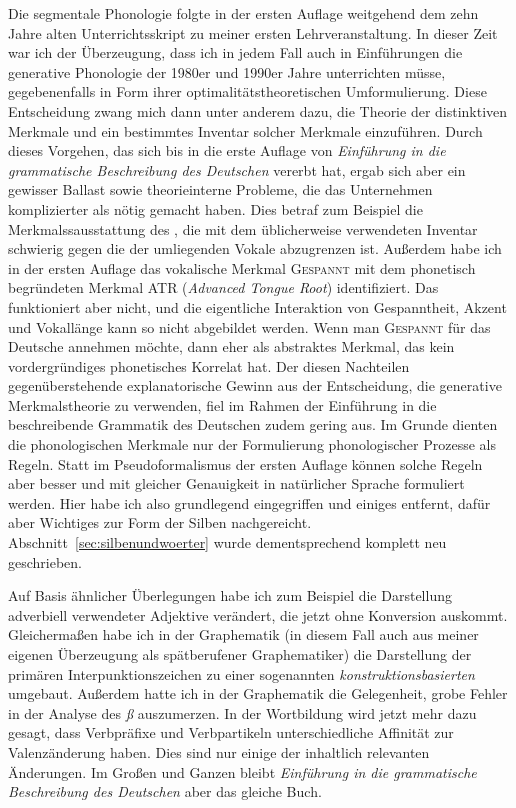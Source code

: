 Die segmentale Phonologie folgte in der ersten Auflage weitgehend dem zehn Jahre alten Unterrichtsskript zu meiner ersten Lehrveranstaltung.
In dieser Zeit war ich der Überzeugung, dass ich in jedem Fall auch in Einführungen die generative Phonologie der 1980er und 1990er Jahre unterrichten müsse, gegebenenfalls in Form ihrer optimalitätstheoretischen Umformulierung.
Diese Entscheidung zwang mich dann unter anderem dazu, die Theorie der distinktiven Merkmale und ein bestimmtes Inventar solcher Merkmale einzuführen.
Durch dieses Vorgehen, das sich bis in die erste Auflage von \textit{Einführung in die grammatische Beschreibung des Deutschen} vererbt hat, ergab sich aber ein gewisser Ballast sowie theorieinterne Probleme, die das Unternehmen komplizierter als nötig gemacht haben.
Dies betraf zum Beispiel die Merkmalssausstattung des \textipa{[5]}, die mit dem üblicherweise verwendeten Inventar schwierig gegen die der umliegenden Vokale abzugrenzen ist.
Außerdem habe ich in der ersten Auflage das vokalische Merkmal \textsc{Gespannt} mit dem phonetisch begründeten Merkmal ATR (\textit{Advanced Tongue Root}) identifiziert.
Das funktioniert aber nicht, und die eigentliche Interaktion von Gespanntheit, Akzent und Vokallänge kann so nicht abgebildet werden.
Wenn man \textsc{Gespannt} für das Deutsche annehmen möchte, dann eher als abstraktes Merkmal, das kein vordergründiges phonetisches Korrelat hat.
Der diesen Nachteilen gegenüberstehende explanatorische Gewinn aus der Entscheidung, die generative Merkmalstheorie zu verwenden, fiel im Rahmen der Einführung in die beschreibende Grammatik des Deutschen zudem gering aus.
Im Grunde dienten die phonologischen Merkmale nur der Formulierung phonologischer Prozesse als Regeln.
Statt im Pseudoformalismus der ersten Auflage können solche Regeln aber besser und mit gleicher Genauigkeit in natürlicher Sprache formuliert werden.
Hier habe ich also grundlegend eingegriffen und einiges entfernt, dafür aber Wichtiges zur Form der Silben nachgereicht.
Abschnitt~\ref{sec:silbenundwoerter} wurde dementsprechend komplett neu geschrieben.

Auf Basis ähnlicher Überlegungen habe ich zum Beispiel die Darstellung adverbiell verwendeter Adjektive verändert, die jetzt ohne Konversion auskommt.
Gleichermaßen habe ich in der Graphematik (in diesem Fall auch aus meiner eigenen Überzeugung als spätberufener Graphematiker) die Darstellung der primären Interpunktionszeichen zu einer sogenannten \textit{konstruktionsbasierten} umgebaut.
Außerdem hatte ich in der Graphematik die Gelegenheit, grobe Fehler in der Analyse des \textit{ß} auszumerzen.
In der Wortbildung wird jetzt mehr dazu gesagt, dass Verbpräfixe und Verbpartikeln unterschiedliche Affinität zur Valenzänderung haben.
Dies sind nur einige der inhaltlich relevanten Änderungen.
Im Großen und Ganzen bleibt \textit{Einführung in die grammatische Beschreibung des Deutschen} aber das gleiche Buch.

